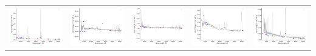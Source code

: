 \begin{center}
\begin{longtable}{l l l l l }
    \includegraphics[width=0.19\linewidth, clip]{Figs/Figs-sdss/spec-6780-56267-0244-STRIPE82-0053-009665.pdf} & \includegraphics[width=0.19\linewidth, clip]{Figs/Figs-sdss/spec-6780-56577-0280-STRIPE82-0053-044359.pdf} & \includegraphics[width=0.19\linewidth, clip]{Figs/Figs-sdss/spec-6781-56274-0268-STRIPE82-0057-039669.pdf} & \includegraphics[width=0.19\linewidth, clip]{Figs/Figs-sdss/spec-6781-56274-0387-STRIPE82-0055-012470.pdf} & \includegraphics[width=0.19\linewidth, clip]{Figs/Figs-sdss/spec-6781-56599-0575-STRIPE82-0056-038512.pdf} \\

\end{longtable}
\end{center}
